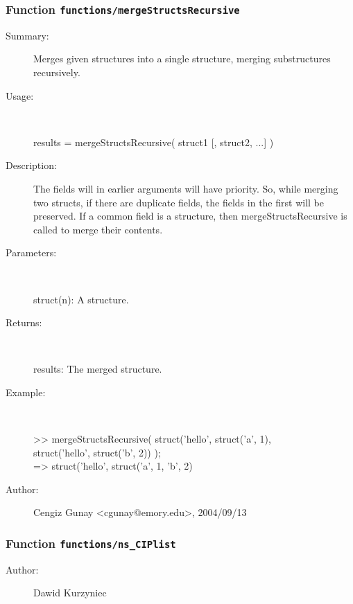 \subsubsection[Function \texttt{mergeStructsRecursive}]{Function \texttt{functions/mergeStructsRecursive}}%
%
\label{ref_functions__mergeStructsRecursive}%
\hypertarget{ref_functions__mergeStructsRecursive}{}%
\begin{description}
\item[Summary:]Merges given structures into a single structure, merging substructures recursively.
%
\item[Usage:]~%
\begin{lyxcode}%
results = mergeStructsRecursive( struct1 [, struct2, ...] )
%
\end{lyxcode}%
%
\item[Description:]%
The fields will in earlier arguments will have priority. So, while merging two
 structs, if there are duplicate fields, the fields in the first will be
 preserved. If a common field is a structure, then mergeStructsRecursive
 is called to merge their contents.
\item[Parameters:]~

struct(n): A structure.
%
\item[Returns:
]~

 	results: The merged structure.
%
\item[Example:]~
\begin{lyxcode} >> mergeStructsRecursive( struct('hello', struct('a', 1), 
\\%
                            struct('hello', struct('b', 2)) );
\\%
  => struct('hello', struct('a', 1, 'b', 2)
\\%
\end{lyxcode}
%
%
\item[Author:]%
Cengiz Gunay <cgunay@emory.edu>, 2004/09/13
%
\end{description}
\methodline%
\subsubsection[Function \texttt{ns\_CIPlist}]{Function \texttt{functions/ns\_CIPlist}}%
%
\label{ref_functions__ns_CIPlist}%
\hypertarget{ref_functions__ns_CIPlist}{}%
\begin{description}
%
%
%
%
%
%
%
\item[Author:]%
Dawid Kurzyniec
%
\end{description}
\methodline%
